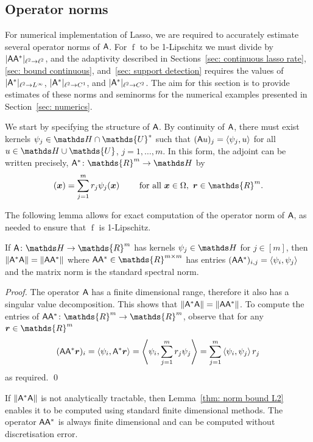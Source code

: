 \documentclass[smallextended]{svjour3}
\let\F\mathds\let\C\mathcal\newcommand{\R}{\F{R}}\newcommand{\A}{\tens{A}}
\newcommand{\norm}[1]{{\left\lVert #1 \right\rVert}}
\newcommand{\IP}[2]{\left\langle #1,#2 \right\rangle}
\newcommand{\op}[1]{\operatorname{#1}}
\newcommand{\1}{\F{1}}
\newcommand*{\varf}[1]{%
	\IfEqCase{#1}{%
		{0}{u}%
		{1}{v}%
		{2}{w}%
	}[u#1]%
}
\newcommand*{\spcf}[1]{%
	\IfEqCase{#1}{%
		{0}{\F{U}}%
		{1}{\F{V}}%
		{2}{\F{W}}%
	}[\F{U}#1]%
}
\newcommand*{\vard}[1]{%
	\IfEqCase{#1}{%
		{0}{\varphi}%
		{1}{\psi}%
	}[\varphi #1]%
}
\newcommand*{\varx}[1]{%
	\IfEqCase{#1}{%
		{0}{x}%
		{1}{y}%
		{2}{z}%
		{3}{r}%
	}[x#1]%
}
\newcommand{\Domain}{\Omega}\newcommand{\domain}{\omega}
\newcommand*{\vvarx}[1]{\vec{\varx{#1}}}
\begin{document}
	
	\subsection{Operator norms}\label{sec: smoothing operators}
	For numerical implementation of Lasso, we are required to accurately estimate several operator norms of $\A$. For $\op{f}$ to be 1-Lipschitz we must divide by $|\A\A^*|_{\ell^2\to\ell^2}$, and the adaptivity described in Sections~\ref{sec: continuous lasso rate}, \ref{sec: bound continuous}, and~\ref{sec: support detection} requires the values of $|\A^*|_{\ell^2\to L^\infty}$, $|\A^*|_{\ell^2\to C^1}$, and $|\A^*|_{\ell^2\to C^2}$. The aim for this section is to provide estimates of these norms and seminorms for the numerical examples presented in Section~\ref{sec: numerics}.
	
	We start by specifying the structure of $\A$. By continuity of $\A$, there must exist kernels $\vard1_j\in \F H\cap\spcf0^*$ such that $(\A\varf0)_j = \IP{\vard1_j}{\varf0}$ for all $\varf0\in \F H\cup\spcf0$, $j=1,\ldots,m$. In this form, the adjoint can be written precisely, $\A^*\colon\R^m\to \F H$ by 
	\begin{equation}
		[\A^*\vvarx3](\vvarx0) = \sum_{j=1}^m \varx3_j\vard1_j(\vvarx0) \qquad \text{ for all }\vvarx0\in\Domain,\ \vvarx3\in\R^m.
	\end{equation}
	
	The following lemma allows for exact computation of the operator norm of $\A$, as needed to ensure that $\op{f}$ is 1-Lipschitz.
	\begin{lemma}\label{thm: norm bound L2}
		If $\A\colon \F H \to \R^m$ has kernels $\vard1_j\in \F H$ for $j\in[m]$, then
		$ \norm{\A^*\A} = \norm{\A\A^*} $
		where $\A\A^*\in\R^{m\times m}$ has entries $(\A\A^*)_{i,j} = \IP{\vard1_i}{\vard1_j}$
		and the matrix norm is the standard spectral norm.
	\end{lemma}
	\begin{proof}
		The operator $\A$ has a finite dimensional range, therefore it also has a singular value decomposition. This shows that $ \norm{\A^*\A} = \norm{\A\A^*} $. To compute the entries of $\A\A^*\colon\R^m\to\R^m$, observe that for any $\vvarx3\in\R^m$
		\begin{equation}
			(\A\A^*\vvarx3)_i = \IP{\vard1_i}{\A^*\vvarx3} = \IP{\vard1_i}{\sum_{j=1}^m\varx3_j\vard1_j} = \sum_{j=1}^m \IP{\vard1_i}{\vard1_j}\varx3_j
		\end{equation}
		as required.
		\qed\end{proof}
	If $\norm{\A^*\A}$ is not analytically tractable, then Lemma~\ref{thm: norm bound L2} enables it to be computed using standard finite dimensional methods. The operator $\A\A^*$ is always finite dimensional and can be computed without discretisation error.
	
\end{document}
